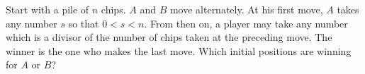 Start with a pile of $n$ chips. $A$ and $B$ move alternately. At his first move, $A$ takes any number $s$ so that $0 < s < n$. From then on, a player may take any number which is a divisor of the number of chips taken at the preceding move. The winner is the one who makes the last move. Which initial positions are winning for $A$ or $B$?
